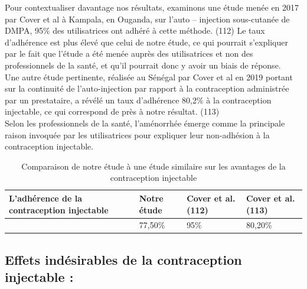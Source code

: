 \noindent Pour contextualiser davantage nos résultats, examinons une étude menée en 2017 par Cover et al à Kampala, en Ouganda, sur l'auto – injection sous-cutanée de DMPA, 95\% des utilisatrices ont adhéré à cette méthode. (112) Le taux d’adhérence est plus élevé que celui de notre étude, ce qui pourrait s’expliquer par le fait que l’étude a été menée auprès des utilisatrices et non des professionnels de la santé, et qu’il pourrait donc y avoir un biais de réponse. \\

\noindent Une autre étude pertinente, réalisée au Sénégal par Cover et al en 2019 portant sur la continuité de l'auto-injection par rapport à la contraception administrée par un prestataire, a révélé un taux d’adhérence 80,2\% à la contraception injectable, ce qui correspond de près à notre résultat. (113)\\

\noindent Selon les professionnels de la santé, l'aménorrhée émerge comme la principale raison invoquée par les utilisatrices pour expliquer leur non-adhésion à la contraception injectable.

\begin{table}[H]
  \centering
  \renewcommand{\arraystretch}{1.5}

  \begin{spacing}{1.5} %
  \begin{tabularx}{\textwidth}{|p{5cm}|X|p{3.7cm}|p{3.6cm}|}
      \hline
      \textbf{L’adhérence de la \newline contraception injectable} & \textbf{Notre étude } & \textbf{Cover et al. (112)} & \textbf{Cover et al. (113)}\\
      \hline
       & 77,50\% & 95\%  & 80,20\%\\
      
      
      \hline
  \end{tabularx}
\end{spacing}
\captionsetup{justification=centering} %
\caption{Comparaison de notre étude à une étude similaire sur les avantages de la contraception injectable}

\end{table}

\subsection{Effets indésirables de la contraception injectable :}

